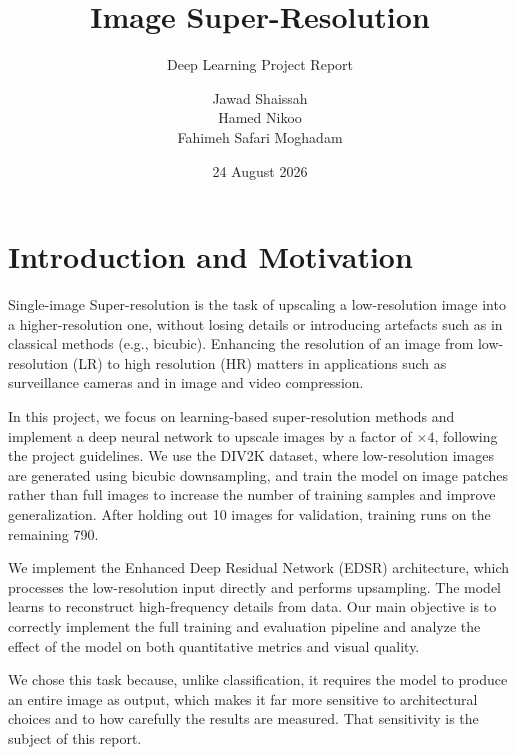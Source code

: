 \documentclass[a4paper,11pt]{article}
\title{Image Super-Resolution}
\subtitle{Deep Learning Project Report}
\date{24 August 2026}
\author{
Jawad Shaissah \\
Hamed Nikoo \\
Fahimeh Safari Moghadam
}
\begin{document}
\maketitle

\tableofcontents
\newpage


\section{Introduction and Motivation}

Single-image Super-resolution is the task of upscaling a low-resolution image into a higher-resolution one, without losing details or introducing artefacts such as in classical methods (e.g., bicubic). Enhancing the resolution of an image from low-resolution (LR) to high resolution (HR) matters in applications such as surveillance cameras and in image and video compression.

\medskip

In this project, we focus on learning-based super-resolution methods and implement a deep neural network to upscale images by a factor of $\times 4$, following the project guidelines. We use the DIV2K dataset, where low-resolution images are generated using bicubic downsampling, and train the model on image patches rather than full images to increase the number of training samples and improve generalization. After holding out 10 images for validation, training runs on the remaining 790. 

\medskip

We implement the Enhanced Deep Residual Network (EDSR) architecture, which processes the low-resolution input directly and performs upsampling. The model learns to reconstruct high-frequency details from data. Our main objective is to correctly implement the full training and evaluation pipeline and analyze the effect of the model on both quantitative metrics and visual quality.

We chose this task because, unlike classification, it requires the model to produce an entire
image as output, which makes it far more sensitive to architectural choices and to how carefully
the results are measured. That sensitivity is the subject of this report.

\end{document}
